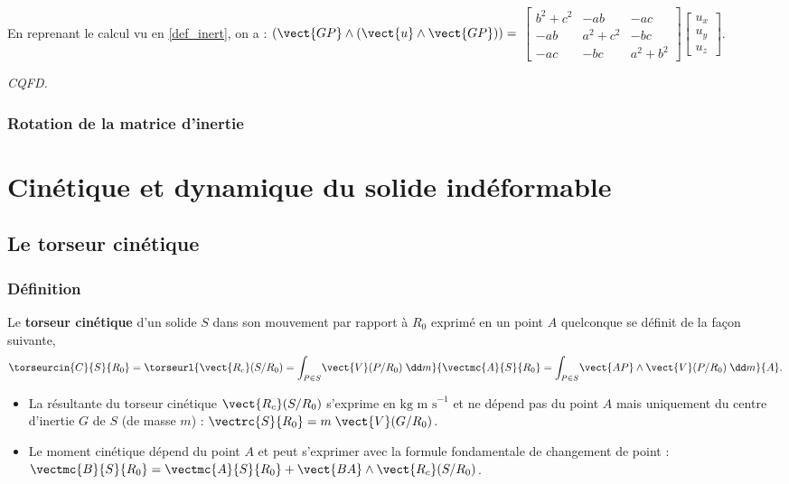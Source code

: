 En reprenant le calcul vu en \ref{def_inert}, on a : 
$\left(\vect{GP}\wedge \left(\vect{u}\wedge \vect{GP} \right) \right) = $
$\begin{bmatrix}
 b^2 +  c^2 &  - ab &      -ac   \\
 -ab  & a^2   +c^2   & - bc   \\
  -ac &    -bc  &   a^2 +b^2 
\end{bmatrix}
\begin{bmatrix}
u_x \\ u_y \\ u_z
\end{bmatrix}$. 

\begin{flushright}
\textit{CQFD.}
\end{flushright}


\subsubsection{Rotation de la matrice d'inertie}

\section{Cinétique et dynamique du solide indéformable}
\subsection{Le torseur cinétique}
\subsubsection{Définition}

\begin{defi}
Le \textbf{torseur cinétique} d'un solide $S$ dans son mouvement par rapport à $R_0$ exprimé en un point $A$ quelconque se définit de la façon suivante,
$$
\torseurcin{C}{S}{R_0}=\torseurl{
\vect{R_c}(S/R_0)=\displaystyle{\int_{P\in S}}\vect{V}(P/R_0)\;\dd m}{\vectmc{A}{S}{R_0}=\displaystyle{\int_{P\in S}}\vect{AP}\wedge \vect{V}(P/R_0)\; \dd m}{A}.
$$
\begin{itemize}
\item La résultante du torseur cinétique $\vect{R_c}(S/R_0)$ s'exprime en $\text{kg m s}^{-1}$ et ne dépend pas du point $A$ mais uniquement du centre d'inertie $G$ de $S$ (de masse $m$) :
$\vectrc{S}{R_0}=m\;\vect{V}(G/R_0)$.

\item Le moment cinétique dépend du point $A$ et peut s'exprimer avec la formule fondamentale de changement de point : $\vectmc{B}{S}{R_0}=\vectmc{A}{S}{R_0}+\vect{BA}\wedge \vect{R_c}(S/R_0)$.
\end{itemize}

\end{defi}


